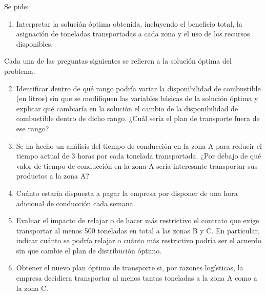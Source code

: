 Se pide:

\begin{enumerate}
    \item Interpretar la solución óptima obtenida, incluyendo el beneficio total, la asignación de toneladas transportadas a cada zona y el uso de los recursos disponibles.
\end{enumerate}

Cada una de las preguntas siguientes se refieren a la solución óptima del problema.

\begin{enumerate}
    \setcounter{enumi}{1} %

    \item Identificar dentro de qué rango podría variar la disponibilidad de combustible (en litros) sin que se modifiquen las variables básicas de la solución óptima y explicar qué cambiaría en la solución el cambio de la disponibilidad de combustible dentro de dicho rango. ¿Cuál sería el plan de transporte fuera de ese rango?

    \item Se ha hecho un análisis del tiempo de conducción en la zona A para reducir el tiempo actual de 3 horas por cada tonelada transportada. ¿Por debajo de qué valor de tiempo de conducción en la zona A sería interesante transportar sus productos a la zona A?

    \item Cuánto estaría dispuesta a pagar la empresa por disponer de una hora adicional de conducción cada semana.


    \item Evaluar el impacto de relajar o de hacer más restrictivo el contrato que exige transportar al menos 500 toneladas en total a las zonas B y C. En particular, indicar cuánto se podría relajar o cuánto más restrictivo podría ser el acuerdo sin que cambie el plan de distribución óptimo.

    \item Obtener el nuevo plan óptimo de transporte si, por razones logísticas, la empresa decidiera transportar al menos tantas toneladas a la zona A como a la zona C.

\end{enumerate}

